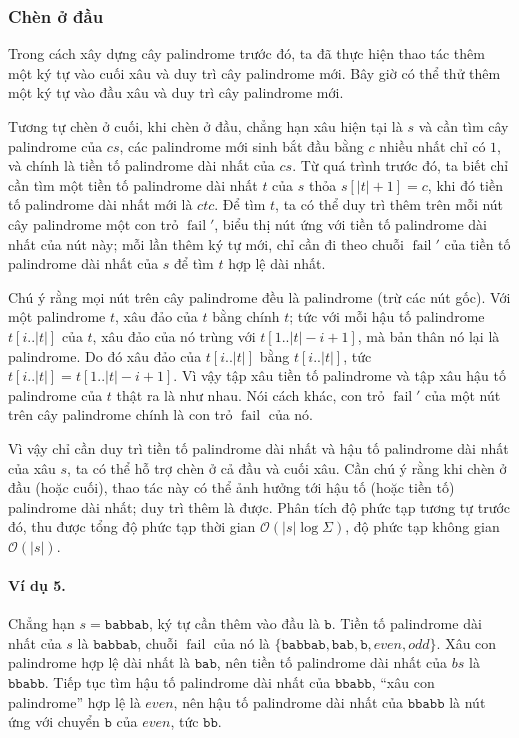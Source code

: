 \documentclass[11pt]{article}
\newcommand{\Oh}{\mathcal{O}}
\begin{document}
\subsubsection{Chèn ở đầu}

Trong cách xây dựng cây palindrome trước đó, ta đã thực hiện thao tác thêm một
ký tự vào cuối xâu và duy trì cây palindrome mới. Bây giờ có thể thử thêm một
ký tự vào đầu xâu và duy trì cây palindrome mới.

Tương tự chèn ở cuối, khi chèn ở đầu, chẳng hạn xâu hiện tại là \(s\) và cần
tìm cây palindrome của \(cs\), các palindrome mới sinh bắt đầu bằng \(c\) nhiều
nhất chỉ có \(1\), và chính là tiền tố palindrome dài nhất của \(cs\). Từ quá
trình trước đó, ta biết chỉ cần tìm một tiền tố palindrome dài nhất \(t\) của
\(s\) thỏa \(s[|t|+1]=c\), khi đó tiền tố palindrome dài nhất mới là \(ctc\).
Để tìm \(t\), ta có thể duy trì thêm trên mỗi nút cây palindrome một con trỏ
\(\operatorname{fail}'\), biểu thị nút ứng với tiền tố palindrome dài nhất của
nút này; mỗi lần thêm ký tự mới, chỉ cần đi theo chuỗi \(\operatorname{fail}'\)
của tiền tố palindrome dài nhất của \(s\) để tìm \(t\) hợp lệ dài nhất.

Chú ý rằng mọi nút trên cây palindrome đều là palindrome (trừ các nút gốc).
Với một palindrome \(t\), xâu đảo của \(t\) bằng chính \(t\); tức với mỗi hậu
tố palindrome \(t[i..|t|]\) của \(t\), xâu đảo của nó trùng với
\(t[1..|t|-i+1]\), mà bản thân nó lại là palindrome. Do đó xâu đảo của
\(t[i..|t|]\) bằng \(t[i..|t|]\), tức
\(t[i..|t|]=t[1..|t|-i+1]\). Vì vậy tập xâu tiền tố palindrome và tập xâu hậu
tố palindrome của \(t\) thật ra là như nhau. Nói cách khác, con trỏ
\(\operatorname{fail}'\) của một nút trên cây palindrome chính là con trỏ
\(\operatorname{fail}\) của nó.

Vì vậy chỉ cần duy trì tiền tố palindrome dài nhất và hậu tố palindrome dài
nhất của xâu \(s\), ta có thể hỗ trợ chèn ở cả đầu và cuối xâu. Cần chú ý rằng
khi chèn ở đầu (hoặc cuối), thao tác này có thể ảnh hưởng tới hậu tố (hoặc
tiền tố) palindrome dài nhất; duy trì thêm là được. Phân tích độ phức tạp
tương tự trước đó, thu được tổng độ phức tạp thời gian
\(\Oh(|s|\log \Sigma)\), độ phức tạp không gian \(\Oh(|s|)\).

\paragraph{Ví dụ 5.}
Chẳng hạn \(s=\texttt{babbab}\), ký tự cần thêm vào đầu là \(\texttt{b}\).
Tiền tố palindrome dài nhất của \(s\) là \(\texttt{babbab}\), chuỗi
\(\operatorname{fail}\) của nó là
\(\{\texttt{babbab},\texttt{bab},\texttt{b},\textit{even},\textit{odd}\}\).
Xâu con palindrome hợp lệ dài nhất là \(\texttt{bab}\), nên tiền tố
palindrome dài nhất của \(bs\) là \(\texttt{bbabb}\). Tiếp tục tìm hậu tố
palindrome dài nhất của \(\texttt{bbabb}\), ``xâu con palindrome'' hợp lệ là
\(\textit{even}\), nên hậu tố palindrome dài nhất của \(\texttt{bbabb}\) là
nút ứng với chuyển \(\texttt{b}\) của \(\textit{even}\), tức \(\texttt{bb}\).
\end{document}
